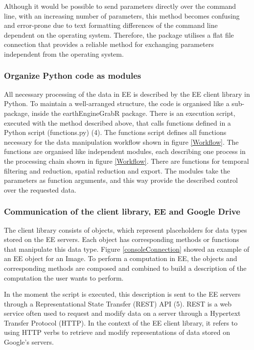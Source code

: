 Although it would be possible to send parameters directly over the command line, with an increasing number of parameters, this method becomes confusing and error-prone due to text formatting differences of the command line dependent on the operating system. Therefore, the package utilises a flat file connection that provides a reliable method for exchanging parameters independent from the operating system.

\subsubsection{Organize Python code as modules}

All necessary processing of the data in EE is described by the EE client library in Python. To maintain a well-arranged structure, the code is organised like a sub-package, inside the earthEngineGrabR package. There is an execution script, executed with the method described above, that calls functions defined in a Python script (functions.py) (4). The functions script defines all functions necessary for the data manipulation workflow shown in figure \ref*{Workflow}. The functions are organised like independent modules, each describing one process in the processing chain shown in figure \ref*{Workflow}. There are functions for temporal filtering and reduction, spatial reduction and export. The modules take the parameters as function arguments, and this way provide the described control over the requested data.

\subsubsection{Communication of the client library, EE and Google Drive}

The client library consists of objects, which represent placeholders for data types stored on the EE servers. Each object has corresponding methods or functions that manipulate this data type. Figure \ref{consoleConnection} showed an example of an EE object for an Image. To perform a computation in EE, the objects and corresponding methods are composed and combined to build a description of the computation the user wants to perform. 

In the moment the script is executed, this description is sent to the EE servers through a Representational State Transfer (REST) API (5). REST is a web service often used to request and modify data on a server through a Hypertext Transfer Protocol (HTTP).
In the context of the EE client library, it refers to using HTTP verbs to retrieve and modify representations of data stored on Google's servers.

